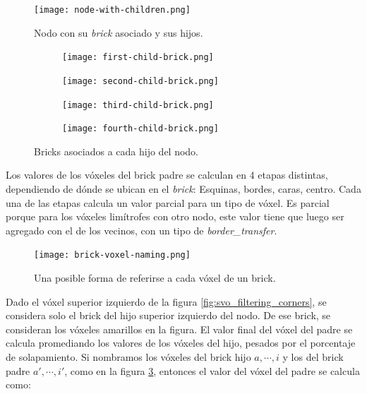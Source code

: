 \begin{figure}[h!]
    \centering
    \texttt{[image: node-with-children.png]}
    \caption{Nodo con su \textit{brick} asociado y sus hijos.}
    \label{fig:node_with_children}
\end{figure}

\begin{figure}[h!]
    \begin{center}
        \begin{subfigure}{.24\textwidth}
            \texttt{[image: first-child-brick.png]}
        \end{subfigure}
        \begin{subfigure}{.24\textwidth}
            \texttt{[image: second-child-brick.png]}
        \end{subfigure}
        \begin{subfigure}{.24\textwidth}
            \texttt{[image: third-child-brick.png]}
        \end{subfigure}
        \begin{subfigure}{.24\textwidth}
            \texttt{[image: fourth-child-brick.png]}
        \end{subfigure}
    \end{center}
    \caption{Bricks asociados a cada hijo del nodo.}
    \label{fig:all_child_bricks}
\end{figure}

Los valores de los vóxeles del brick padre se calculan en 4 etapas distintas, dependiendo de dónde se ubican en el \textit{brick}: Esquinas, bordes, caras, centro.
Cada una de las etapas calcula un valor parcial para un tipo de vóxel.
Es parcial porque para los vóxeles limítrofes con otro nodo, este valor tiene que luego ser agregado con el de los vecinos, con un tipo de \textit{border\_transfer}.


\begin{figure}
    \centering
    \texttt{[image: brick-voxel-naming.png]}
    \caption{Una posible forma de referirse a cada vóxel de un brick.}
    \label{fig:brick-voxel-naming}
\end{figure}

Dado el vóxel superior izquierdo de la figura \ref{fig:svo_filtering_corners}, se considera solo el brick del hijo superior izquierdo del nodo.
De ese brick, se consideran los vóxeles amarillos en la figura.
El valor final del vóxel del padre se calcula promediando los valores de los vóxeles del hijo, pesados por el porcentaje de solapamiento.
Si nombramos los vóxeles del brick hijo $a, \cdots, i$ y los del brick padre $a', \cdots, i'$, como en la figura \ref{fig:brick-voxel-naming}, entonces el valor del vóxel del padre se calcula como:


